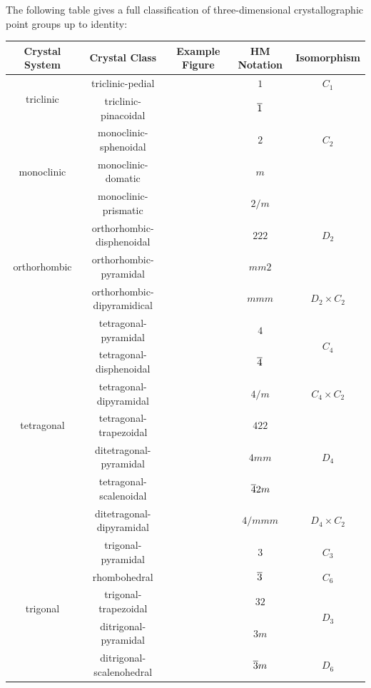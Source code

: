 \begin{importanttheorem}{}{}
	The following table gives a full classification of three-dimensional crystallographic point groups up to identity:
\end{importanttheorem}
\begin{center}
	\begin{tabular}{c|c|cc|c}
		Crystal System & Crystal Class & Example Figure & HM Notation & Isomorphism\\\hline
		\multirow{2}{*}{triclinic} & triclinic-pedial & & $1$ & $C_1$\\\cline{3-5}
		& triclinic-pinacoidal & & $\overline{{1}}$ & \multirow{3}{*}{$C_2$}\\\cline{1-4}
		\multirow{3}{*}{monoclinic} & monoclinic-sphenoidal & & $2$ \\\cline{3-4}
		& monoclinic-domatic & & $m$\\\cline{3-5}
		& monoclinic-prismatic & & $2/m$ & \multirow{3}{*}{$D_2$}\\\cline{1-4}
		\multirow{3}{*}{orthorhombic} & orthorhombic-disphenoidal & & $222$ &\\\cline{3-4}
		& orthorhombic-pyramidal & & $mm2$ &\\\cline{3-5}
		& orthorhombic-dipyramidical & & $mmm$ & $D_2 \times C_2$\\\cline{1-5}
		\multirow{7}{*}{tetragonal} & tetragonal-pyramidal & & $4$ & \multirow{2}{*}{$C_4$}\\\cline{3-4}
		& tetragonal-disphenoidal & & $\overline{{4}}$ &\\\cline{3-5}
		& tetragonal-dipyramidal & & $4/m$ & $C_4 \times C_2$\\\cline{3-5}
		& tetragonal-trapezoidal & & $422$ & \multirow{3}{*}{$D_4$}\\\cline{3-4}
		& ditetragonal-pyramidal & & $4mm$ &\\\cline{3-4}
		& tetragonal-scalenoidal & & $\overline{{4}}2m$ &\\\cline{3-5}
		& ditetragonal-dipyramidal & & $4/mmm$ & $D_4 \times C_2$\\\cline{1-5}
		\multirow{5}{*}{trigonal} & trigonal-pyramidal & & $3$ & $C_3$\\\cline{3-5}
		& rhombohedral & & $\overline{{3}}$ & $C_6$\\\cline{3-5}
		& trigonal-trapezoidal & & $32$ & \multirow{2}{*}{$D_3$}\\\cline{3-4}
		& ditrigonal-pyramidal & & $3m$ &\\\cline{3-5}
		& ditrigonal-scalenohedral & & $\overline{{3}}m$ & $D_6$\\\cline{1-5}

\end{tabular}
\end{center}
